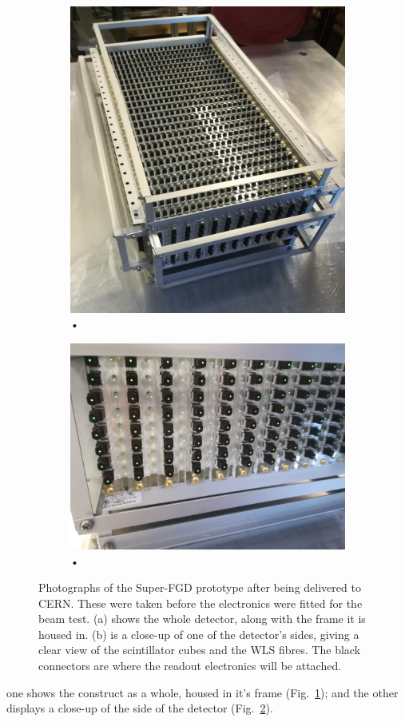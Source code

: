\documentclass[aps,pra,12pt,notitlepage,tightenlines]{revtex4-1}
\begin{document}
 \begin{figure}
  \centering
  \begin{subfigure}{.5\textwidth}
   \centering
   \includegraphics[width=.7\linewidth]{proto}
   \caption{•}
   \label{protoa}
  \end{subfigure}%
  \begin{subfigure}{.5\textwidth}
   \centering
   \includegraphics[width=.8\linewidth]{side}
   \caption{•}
   \label{protob}
  \end{subfigure}
  \caption{Photographs of the Super-FGD prototype after being delivered to CERN. These were taken before the electronics were fitted for the beam test. (a) shows the whole detector, along with the frame it is housed in. (b) is a close-up of one of the detector's sides, giving a clear view of the scintillator cubes and the WLS fibres. The black connectors are where the readout electronics will be attached.}
  \label{fig:proto}
 \end{figure}
one shows the construct as a whole, housed in it's frame (Fig.\ \ref{protoa}); and the other displays a close-up of the side of the detector (Fig.\ \ref{protob}).
\end{document}
